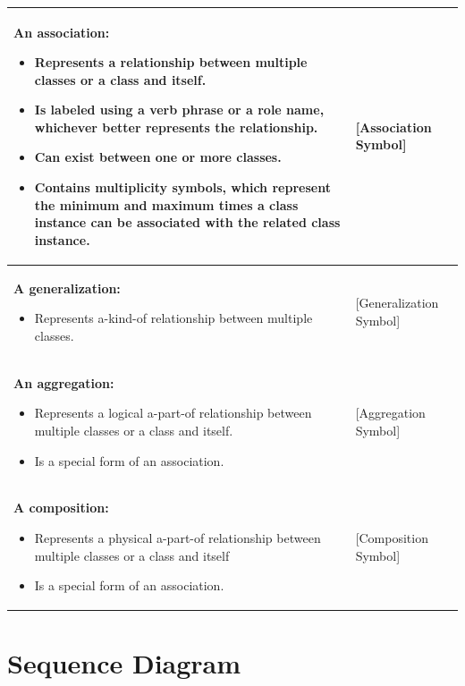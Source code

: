 \documentclass[12pt,a4paper]{report}
\begin{document}
\begin{longtable}{|p{8cm}|p{4cm}|}
\textbf{An association:} \newline
\begin{itemize}
    \item Represents a relationship between multiple classes or a class and itself.
    \item Is labeled using a verb phrase or a role name, whichever better represents the relationship.
    \item Can exist between one or more classes.
    \item Contains multiplicity symbols, which represent the minimum and maximum times a class instance can be associated with the related class instance.
\end{itemize} & [Association Symbol] \\
\hline

\textbf{A generalization:} \newline
\begin{itemize}
    \item Represents a-kind-of relationship between multiple classes.
\end{itemize} & [Generalization Symbol] \\
\hline

\textbf{An aggregation:} \newline
\begin{itemize}
    \item Represents a logical a-part-of relationship between multiple classes or a class and itself.
    \item Is a special form of an association.
\end{itemize} & [Aggregation Symbol] \\
\hline

\textbf{A composition:} \newline
\begin{itemize}
    \item Represents a physical a-part-of relationship between multiple classes or a class and itself
    \item Is a special form of an association.
\end{itemize} & [Composition Symbol] \\
\hline

\end{longtable}

\section{Sequence Diagram}
\end{document}
